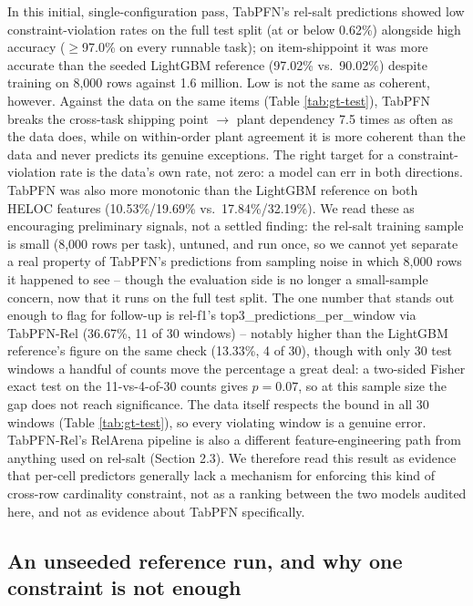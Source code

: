 \documentclass[11pt]{article}
\begin{document}
In this initial, single-configuration pass, TabPFN's rel-salt predictions showed low
constraint-violation rates on the full test split (at or below 0.62\%) alongside
high accuracy ($\geq$97.0\% on every runnable task); on item-shippoint it was more accurate
than the seeded LightGBM reference (97.02\% vs.\ 90.02\%) despite training on 8{,}000 rows
against 1.6 million. Low is not the same as coherent, however. Against the data on the same
items (Table \ref{tab:gt-test}), TabPFN breaks the cross-task shipping point $\to$ plant
dependency 7.5 times as often as the data does, while on within-order plant agreement it is
more coherent than the data and never predicts its genuine exceptions. The right target for a
constraint-violation rate is the data's own rate, not zero: a model can err in both directions.
TabPFN was also more monotonic than the LightGBM reference on both HELOC features (10.53\%/19.69\%
vs.\ 17.84\%/32.19\%). We read these as encouraging preliminary signals, not a settled finding: the
rel-salt training sample is small (8{,}000 rows per task), untuned, and run once, so we cannot
yet separate a real property of TabPFN's predictions from sampling noise in which 8{,}000
rows it happened to see -- though the evaluation side is no longer a small-sample concern,
now that it runs on the full test split. The one number that
stands out enough to flag for follow-up is rel-f1's top3\_predictions\_per\_window via
TabPFN-Rel (36.67\%, 11 of 30 windows) -- notably higher than the LightGBM reference's figure
on the same check (13.33\%, 4 of 30), though with only 30 test windows a handful of counts
move the percentage a great deal: a two-sided Fisher exact test on the 11-vs-4-of-30 counts
gives $p=0.07$, so at this sample size the gap does not reach significance. The data itself
respects the bound in all 30 windows (Table \ref{tab:gt-test}), so every violating window is a
genuine error. TabPFN-Rel's RelArena pipeline is also a different feature-engineering path from
anything used on rel-salt (Section 2.3). We therefore read this result as evidence that per-cell
predictors generally lack a mechanism for enforcing this kind of cross-row cardinality
constraint, not as a ranking between the two models audited here, and not as evidence about
TabPFN specifically.

\subsection{An unseeded reference run, and why one constraint is not enough}
\label{sec:masking}
\end{document}
